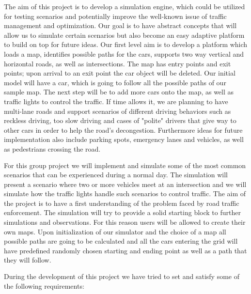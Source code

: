 \documentclass[oneside]{article}
\begin{document}
The aim of this project is to develop a simulation engine, which could be utilized for testing scenarios and potentially improve the well-known issue of traffic management and optimization. Our goal is to have abstract concepts that will allow us to simulate certain scenarios but also become an easy adaptive platform to build on top for future ideas. Our first level aim is to develop a platform which loads a map, identifies possible paths for the cars, supports two way vertical and horizontal roads, as well as intersections. The map has entry points and exit points; upon arrival to an exit point the car object will be deleted. Our initial model will have a car, which is going to follow all the possible paths of our sample map. The next step will be to add more cars onto the map, as well as traffic lights to control the traffic. If time allows it, we are planning to have multi-lane roads and support scenarios of different driving behaviors such as reckless driving, too slow driving and cases of "polite" drivers that give way to other cars in order to help the road's decongestion. Furthermore ideas for future implementation also include parking spots, emergency lanes and vehicles, as well as pedestrians crossing the road. 
\newline

\noindent For this group project we will implement and simulate some of the most common scenarios that can be experienced during a normal day. The simulation will present a scenario where two or more vehicles meet at an intersection and we will simulate how the traffic lights handle such scenarios to control traffic. The aim of the project is to have a first understanding of the problem faced by road traffic enforcement. The simulation will try to provide a solid starting block to further simulations and observations. For this reason users will be allowed to create their own maps. Upon initialization of our simulator and the choice of a map all possible paths are going to be calculated and all the cars entering the grid will have predefined randomly chosen starting and ending point as well as a path that they will follow. 

\noindent During the development of this project we have tried to set and satisfy some of the following requirements: 
\newline
\end{document}

